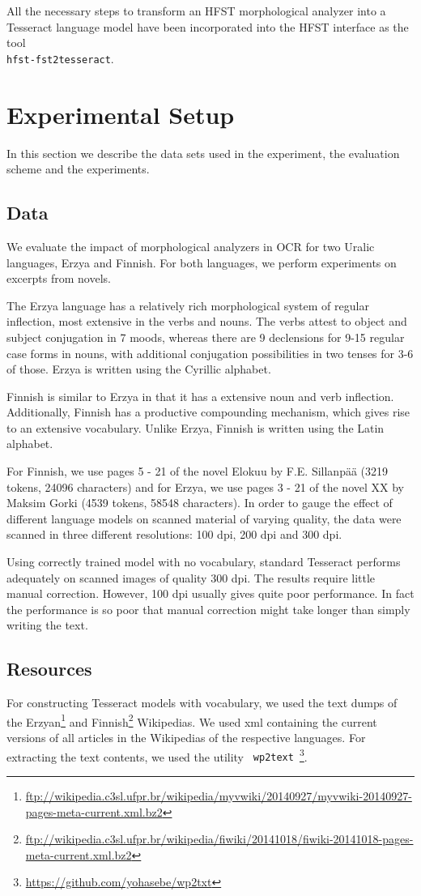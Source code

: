 \documentclass[b5paper]{article}
\begin{document}
All the necessary steps to transform an HFST morphological analyzer
into a Tesseract language model have been incorporated into the HFST
interface as the tool\\{\tt hfst-fst2tesseract}.

\section{Experimental Setup}
\label{exp}

In this section we describe the data sets used in the experiment, the
evaluation scheme and the experiments.

\subsection{Data}
We evaluate the impact of morphological analyzers in OCR for two
Uralic languages, Erzya and Finnish. For both languages, we perform
experiments on excerpts from novels.
 
The Erzya language has a relatively rich morphological system of
regular inflection, most extensive in the verbs and nouns. The verbs
attest to object and subject conjugation in 7 moods, whereas there are
9 declensions for 9-15 regular case forms in nouns, with additional
conjugation possibilities in two tenses for 3-6 of those. Erzya is
written using the Cyrillic alphabet.

Finnish is similar to Erzya in that it has a extensive noun and verb
inflection. Additionally, Finnish has a productive compounding
mechanism, which gives rise to an extensive vocabulary. Unlike Erzya,
Finnish is written using the Latin alphabet.

For Finnish, we use pages 5 - 21 of the novel Elokuu by
F.E. Sillanp\"{a}\"{a} \cite{sillanpaa08} (3219 tokens, 24096 characters) and for Erzya, we use pages
3 - 21 of the novel XX by Maksim Gorki \cite{gorki} (4539 tokens, 58548 characters). In order to gauge
the effect of different language models on scanned material of varying
quality, the data were scanned in three different resolutions: 100
dpi, 200 dpi and 300 dpi.

Using correctly trained model with no vocabulary, standard Tesseract
performs adequately on scanned images of quality 300 dpi. The results
require little manual correction. However, 100 dpi usually gives quite
poor performance. In fact the performance is so poor that manual
correction might take longer than simply writing the text.

\subsection{Resources}
For constructing Tesseract models with vocabulary, we used the text
dumps of the
Erzyan\footnote{\url{ftp://wikipedia.c3sl.ufpr.br/wikipedia/myvwiki/20140927/myvwiki-20140927-pages-meta-current.xml.bz2}}
and
Finnish\footnote{\url{ftp://wikipedia.c3sl.ufpr.br/wikipedia/fiwiki/20141018/fiwiki-20141018-pages-meta-current.xml.bz2}}
Wikipedias. We used xml containing the current versions of all
articles in the Wikipedias of the respective languages. For extracting
the text contents, we used the utility {\tt
  wp2text}~\footnote{\url{https://github.com/yohasebe/wp2txt}}.
\end{document}
